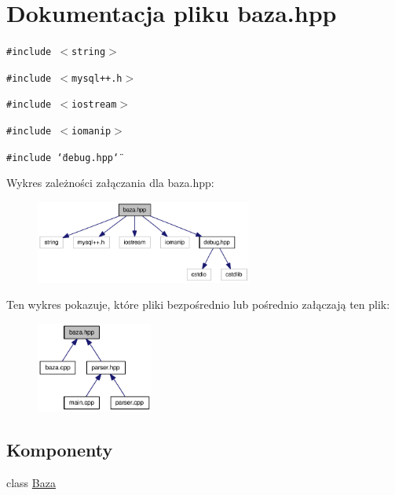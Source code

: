 \hypertarget{a00007}{
\section{Dokumentacja pliku baza.hpp}
\label{de/d5e/a00007}
}
{\tt \#include $<$string$>$}\par
{\tt \#include $<$mysql++.h$>$}\par
{\tt \#include $<$iostream$>$}\par
{\tt \#include $<$iomanip$>$}\par
{\tt \#include \char`\"{}debug.hpp\char`\"{}}\par


Wykres zależności załączania dla baza.hpp:\nopagebreak
\begin{figure}[H]
\begin{center}
\leavevmode
\includegraphics[width=202pt]{d4/d8c/a00035}
\end{center}
\end{figure}


Ten wykres pokazuje, które pliki bezpośrednio lub pośrednio załączają ten plik:\nopagebreak
\begin{figure}[H]
\begin{center}
\leavevmode
\includegraphics[width=108pt]{de/d8c/a00036}
\end{center}
\end{figure}
\subsection*{Komponenty}
\begin{CompactItemize}
\item 
class \hyperlink{a00001}{Baza}
\end{CompactItemize}
